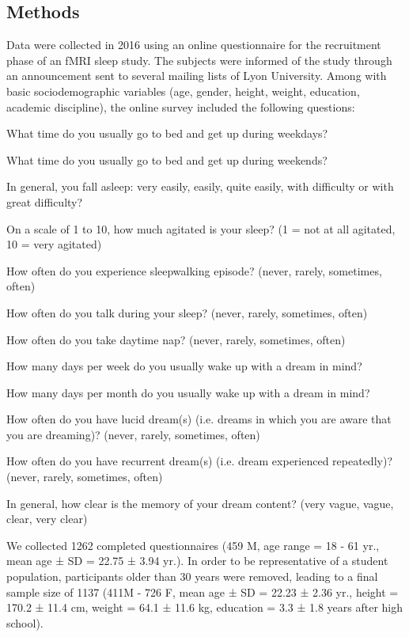 \subsection*{Methods}
\label{res:survey:methods}

Data were collected in 2016 using an online questionnaire for the recruitment phase of an fMRI sleep study. The subjects were informed of the study through an announcement sent to several mailing lists of Lyon University. Among with basic sociodemographic variables (age, gender, height, weight, education, academic discipline), the online survey included the following questions:

\begin{my_list_num}
    \item What time do you usually go to bed and get up during weekdays?
    \item What time do you usually go to bed and get up during weekends?
    \item In general, you fall asleep: very easily, easily, quite easily, with difficulty or with great difficulty?
    \item On a scale of 1 to 10, how much agitated is your sleep? (1 = not at all agitated, 10 = very agitated)
    \item How often do you experience sleepwalking episode? (never, rarely, sometimes, often)
    \item How often do you talk during your sleep? (never, rarely, sometimes, often)
    \item How often do you take daytime nap? (never, rarely, sometimes, often)
    \item How many days per week do you usually wake up with a dream in mind?
    \item How many days per month do you usually wake up with a dream in mind?
    \item How often do you have lucid dream(s) (i.e. dreams in which you are aware that you are dreaming)? (never, rarely, sometimes, often)
    \item How often do you have recurrent dream(s) (i.e. dream experienced repeatedly)? (never, rarely, sometimes, often)
    \item In general, how clear is the memory of your dream content? (very vague, vague, clear, very clear)
\end{my_list_num}

We collected 1262 completed questionnaires (459 M, age range = 18 - 61 yr., mean age ± SD = 22.75 ± 3.94 yr.). In order to be representative of a student population, participants older than 30 years were removed, leading to a final sample size of 1137 (411M - 726 F, mean age ± SD  = 22.23 ± 2.36 yr., height = 170.2 ± 11.4 cm, weight = 64.1 ± 11.6 kg, education = 3.3 ± 1.8 years after high school).

